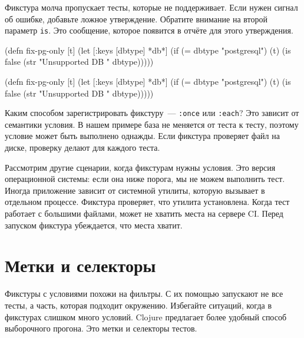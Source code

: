 Фикстура молча пропускает тесты, которые не поддерживает. Если нужен сигнал об
ошибке, добавьте ложное утверждение. Обратите внимание на второй параметр
\verb|is|. Это сообщение, которое появится в отчёте для этого утверждения.

\ifx\devicetype\mobile

\begin{english}
  \begin{clojure}
(defn fix-pg-only [t]
  (let [{:keys [dbtype]} *db*]
    (if (= dbtype "postgresql")
      (t)
      (is false
        (str "Unsupported DB "
          dbtype)))))
  \end{clojure}
\end{english}

\else

\begin{english}
  \begin{clojure}
(defn fix-pg-only [t]
  (let [{:keys [dbtype]} *db*]
    (if (= dbtype "postgresql")
      (t)
      (is false (str "Unsupported DB " dbtype)))))
  \end{clojure}
\end{english}

\fi

Каким способом зарегистрировать фикстуру~--- \verb|:once| или \verb|:each|?
Это зависит от семантики условия. В нашем примере база не меняется от теста к
тесту, поэтому условие может быть выполнено однажды. Если фикстура проверяет
файл на диске, проверку делают для каждого теста.

Рассмотрим другие сценарии, когда фикстурам нужны условия. Это версия
операционной системы: если она ниже порога, мы не можем выполнить тест. Иногда
приложение зависит от системной утилиты, которую вызывает в отдельном
процессе. Фикстура проверяет, что утилита установлена. Когда тест работает с
большими файлами, может не хватить места на сервере CI. Перед запуском фикстура
убеждается, что места хватит.

\section{Метки и селекторы}


Фикстуры с условиями похожи на фильтры. С их помощью запускают не все тесты, а
часть, которая подходит окружению. Избегайте ситуаций, когда в фикстурах слишком
много условий. Clojure предлагает более удобный способ выборочного
прогона. Это метки и селекторы тестов.

